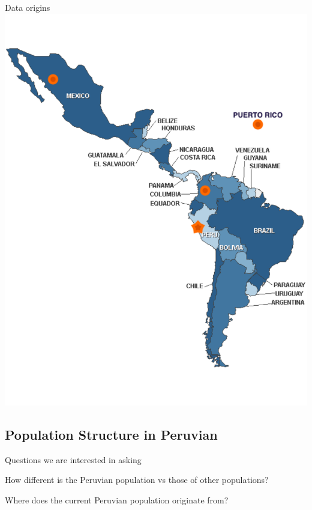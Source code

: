 \documentclass[11pt,xcolor=table]{beamer}
\begin{document}
\begin{frame}{Data origins}
\centering
\includegraphics[width=.8\textwidth]{pics/south_america_map.pdf}
\end{frame}

\subsection{Population Structure in Peruvian}
\begin{frame}{Questions we are interested in asking}
\begin{block}{How different is the Peruvian population vs those of other populations?}
\end{block}
\begin{block}{Where does the current Peruvian population originate from?}
\end{block}

\end{frame}
\end{document}
